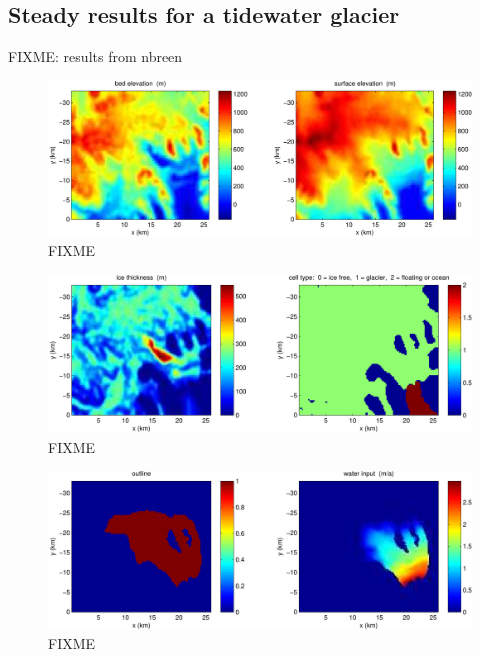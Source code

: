 \documentclass[11pt,final]{amsart}%
\begin{document}
\subsection*{Steady results for a tidewater glacier}

FIXME: results from nbreen

\begin{figure}[ht]
\includegraphics[width=7.0in,keepaspectratio=true]{figs/bed-surf-250m}
\caption{FIXME}
\end{figure}

\begin{figure}[ht]
\includegraphics[width=7.0in,keepaspectratio=true]{figs/icethk-icefree-float-250m}
\caption{FIXME}
\end{figure}

\begin{figure}[ht]
\includegraphics[width=7.0in,keepaspectratio=true]{figs/outline-input-250m}
\caption{FIXME}
\end{figure}
\end{document}
